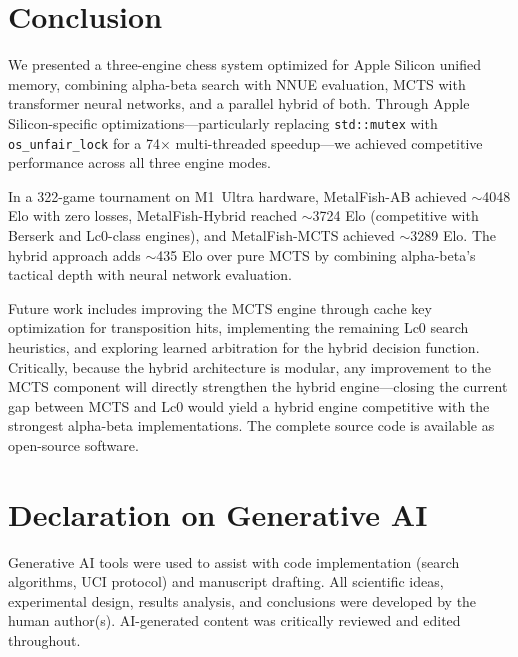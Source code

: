 \documentclass{svproc}
\begin{document}
\section{Conclusion}
\label{sec:conclusion}

We presented a three-engine chess system optimized for Apple Silicon unified memory, combining alpha-beta search with NNUE evaluation, MCTS with transformer neural networks, and a parallel hybrid of both. Through Apple Silicon-specific optimizations---particularly replacing \texttt{std::mutex} with \texttt{os\_unfair\_lock} for a 74$\times$ multi-threaded speedup---we achieved competitive performance across all three engine modes.

In a 322-game tournament on M1~Ultra hardware, MetalFish-AB achieved $\sim$4048 Elo with zero losses, MetalFish-Hybrid reached $\sim$3724 Elo (competitive with Berserk and Lc0-class engines), and MetalFish-MCTS achieved $\sim$3289 Elo. The hybrid approach adds $\sim$435 Elo over pure MCTS by combining alpha-beta's tactical depth with neural network evaluation.

Future work includes improving the MCTS engine through cache key optimization for transposition hits, implementing the remaining Lc0 search heuristics, and exploring learned arbitration for the hybrid decision function. Critically, because the hybrid architecture is modular, any improvement to the MCTS component will directly strengthen the hybrid engine---closing the current gap between MCTS and Lc0 would yield a hybrid engine competitive with the strongest alpha-beta implementations. The complete source code is available as open-source software.


\section*{Declaration on Generative AI}
Generative AI tools were used to assist with code implementation (search algorithms, UCI protocol) and manuscript drafting. All scientific ideas, experimental design, results analysis, and conclusions were developed by the human author(s). AI-generated content was critically reviewed and edited throughout.

\end{document}
